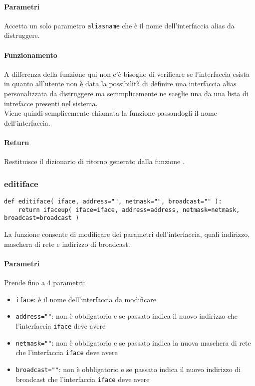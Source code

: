 \documentclass[11pt]{article}
\begin{document}
\paragraph{Parametri}
Accetta un solo parametro \texttt{aliasname} che è il nome dell'interfaccia alias da distruggere.
\paragraph{Funzionamento}
A differenza della funzione  qui non c'è bisogno di verificare se l'interfaccia
esista in quanto all'utente non è data la possibilità di definire una interfaccia alias personalizzata
da distruggere ma semmplicemente ne sceglie una da una lista di intrefacce presenti nel sistema.\\
Viene quindi semplicemente chiamata la funzione  passandogli il nome dell'interfaccia.
\paragraph{Return}
Restituisce il dizionario di ritorno generato dalla funzione .

\subsubsection{editiface}\label{editiface}
\begin{lstlisting}
def editiface( iface, address="", netmask="", broadcast="" ):
    return ifaceup( iface=iface, address=address, netmask=netmask, broadcast=broadcast ) 
\end{lstlisting}
La funzione consente di modificare dei parametri dell'interfaccia, quali indirizzo,
maschera di rete e indirizzo di broadcast.
\paragraph{Parametri}
Prende fino a 4 parametri:
\begin{itemize}
	\item{\texttt{iface}: è il nome dell'interfaccia da modificare}
	\item{\texttt{address=""}: non è obbligatorio e se passato indica il nuovo indirizzo che
		l'interfaccia \texttt{iface} deve avere}
	\item{\texttt{netmask=""}: non è obbligatorio e se passato indica la nuova maschera di rete
		che l'interfaccia \texttt{iface} deve avere}
	\item{\texttt{broadcast=""}: non è obbligatorio e se passato indica il nuovo indirizzo di broadcast
		che l'interfaccia \texttt{iface} deve avere}
\end{itemize}
\end{document}
